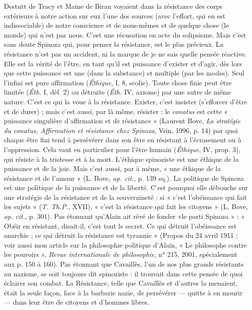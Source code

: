 Destutt de Tracy et Maine de Biran voyaient dans la résistance des corps
extérieurs à notre action sur eux l’une des sources (avec l'effort, qui en est indissociable)
de notre conscience et de nous-mêmes et de quelque chose (le monde)
qui n’est pas nous. C’est une récusation en acte du solipsisme. Mais c’est sans
doute Spinoza qui, pour penser la résistance, est le plus précieux. La résistance
n’est pas un accident, ni la marque de je ne sais quelle pensée réactive. Elle est
la vérité de l'être, en tant qu'il est puissance d’exister et d’agir, dès lors que cette
puissance est une (dans la substance) et multiple (par les modes). Seul l'infini
est pure affirmation ({\it Éthique}, I, 8, scolie). Toute chose finie peut être limitée
({\it Éth.} I, déf. 2) ou détruite ({\it Éth.} IV, axiome) par une autre de même nature.
C’est ce qui la voue à la résistance. Exister, c’est insister (s’efforcer d’être et de
durer) ; mais c’est aussi, par là même, résister : le {\it conatus} est cette « puissance
singulière d’affirmation et de résistance » (Laurent Bove, {\it La stratégie du conatus,
Affirmation et résistance chez Spinoza}, Vrin, 1996, p. 14) par quoi chaque être
fini tend à persévérer dans son être en résistant à l’écrasement ou à l'oppression.
Cela vaut en particulier pour l'être humain ({\it Éthique}, IV, prop. 3), qui résiste à
la tristesse et à la mort. L’éthique spinoziste est une éthique de la puissance et
de la joie. Mais c’est aussi, par à même, « une éthique de la résistance et de
l'amour » (L. Bove, {\it op. cit.}, p. 139 sq.). La politique de Spinoza est une politique
de la puissance et de la liberté. C’est pourquoi elle débouche sur une stratégie
de la résistance et de la souveraineté : si « c’est l’obéissance qui fait les
sujets » ({\it T. Th.P.}, XVII), « c’est la résistance qui fait les citoyens » (L. Bove, {\it op.
cit.}, p. 301). Pas étonnant qu’Alain ait rêvé de fonder «le parti Spinoza » :
« Obéir en résistant, disait-il, c’est tout le secret. Ce qui détruit l’obéissance est
anarchie ; ce qui détruit la résistance est tyrannie » (Propos du 24 avril 1911 ;
voir aussi mon article sur la philosophie politique d’Alain, « Le philosophe
contre les pouvoirs », {\it Revue internationale de philosophie}, n° 215, 2001, spécialement
aux p. 150 à 160). Pas étonnant que Cavaillès, l’un de nos plus grands
résistants au nazisme, se soit toujours dit spinoziste : il trouvait dans cette
pensée de quoi éclairer son combat. La Résistance, telle que Cavaillès et
d’autres la menaient, était la seule façon, face à la barbarie nazie, de persévérer
— quitte à en mourir — dans leur être de citoyens et d'hommes libres.

